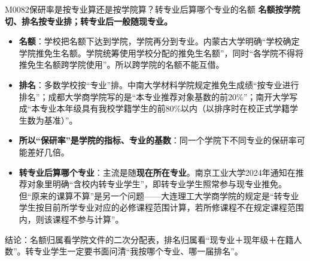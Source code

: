 \begin{qa}{M0082}{保研率是按专业算还是按学院算？转专业后算哪个专业的名额}
\textbf{名额按学院切、排名按专业排；转专业后一般随现专业。}

\begin{itemize}
  \item \textbf{名额}：学校把名额下达到学院，学院再分到专业。内蒙古大学明确“学校确定学院推免生名额。学院统筹使用学校分配的推免生名额”，同时“各学院不得将推免生名额跨学院使用”。所以跨学院的名额不能互借。
  \item \textbf{排名}：多数学校按“专业”排。中南大学材料学院规定推免生成绩“按专业进行排名”；成都大学商学院写的是“本专业推荐对象基数的前20\%”；南开大学写成“本专业本年级具有我校学籍学生的前80\%以内（以排序时在校正式学籍学生数为基准）”。
  \item \textbf{所以“保研率”是学院的指标、专业的基数}：同一个学院下不同专业的保研率可能差好几倍。
  \item \textbf{转专业后算哪个专业}：主流是随\textbf{现在所在专业}。南京工业大学2024年通知在推荐对象里明确“含校内转专业学生”，即转专业学生照常参与现专业推免。但“原来的课算不算”是另一个问题——大连理工大学商学院的规定是“转专业学生按目前所学专业对应的必修课程范围计算，若所修课程不在规定课程范围内，则该课程不参与计算”。
\end{itemize}

结论：名额归属看学院文件的二次分配表，排名归属看“现专业＋现年级＋在籍人数”。转专业学生一定要书面问清“我按哪个专业、哪一届排名”。
\end{qa}

